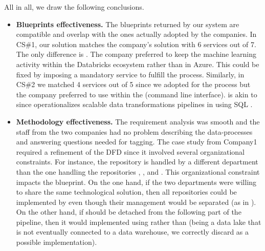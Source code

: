 All in all, we draw the following conclusions.
\begin{itemize}
    \item \textbf{Blueprints effectiveness.} The blueprints returned by our system are compatible and overlap with the ones actually adopted by the companies. In CS\#1, our solution matches the company's solution with 6 services out of 7. The only difference is . The company preferred to keep the machine learning activity within the Databricks ecosystem rather than in Azure. This could be fixed by imposing a mandatory service to fulfill the  process. Similarly, in CS\#2 we matched 4 services out of 5 since we adopted  for the  process but the company preferred to use  within the  (command line interface).  is akin to  since  operationalizes scalable data transformations pipelines in  using SQL \cite{dataform}.

\item \textbf{Methodology effectiveness.} The requirement analysis was smooth and the staff from the two companies had no problem describing the data-processes and answering questions needed for tagging. The case study from Company1 required a refinement of the DFD since it involved several organizational constraints. For instance, the  repository is handled by a different department than the one handling the repositories , , and . This organizational constraint impacts the blueprint. On the one hand, if the two departments were willing to share the same technological solution, then all repositories could be implemented by  even though their management would be separated (as in ). On the other hand, if  should be detached from the following part of the pipeline, then it would implemented using  rather than  (being a data lake that is not eventually connected to a data warehouse, we correctly discard  as a possible implementation).
\end{itemize}
